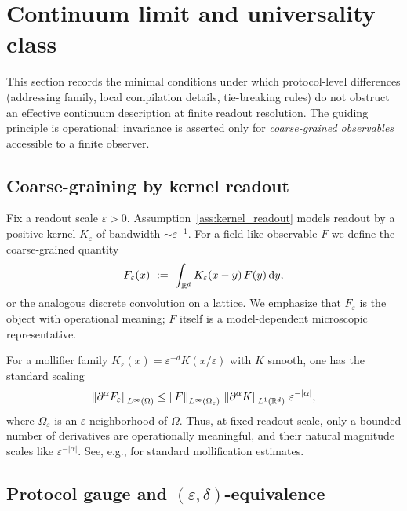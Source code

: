 \section{Continuum limit and universality class}
\label{sec:continuum_universality}

This section records the minimal conditions under which protocol-level differences (addressing family, local compilation details, tie-breaking rules) do not obstruct an effective continuum description at finite readout resolution.
The guiding principle is operational: invariance is asserted only for \emph{coarse-grained observables} accessible to a finite observer.

\subsection{Coarse-graining by kernel readout}
\label{subsec:kernel_coarse_grain}

Fix a readout scale $\varepsilon>0$.
Assumption~\ref{ass:kernel_readout} models readout by a positive kernel $K_\varepsilon$ of bandwidth $\sim \varepsilon^{-1}$.
For a field-like observable $F$ we define the coarse-grained quantity
\begin{equation}
  F_\varepsilon(x)\ :=\ \int_{\mathbb{R}^d} K_\varepsilon(x-y)\,F(y)\,\mathrm{d} y,
\end{equation}
or the analogous discrete convolution on a lattice.
We emphasize that $F_\varepsilon$ is the object with operational meaning; $F$ itself is a model-dependent microscopic representative.

\begin{remark}
\label{rem:mollifier_derivative_scaling}
For a mollifier family $K_\varepsilon(x)=\varepsilon^{-d}K(x/\varepsilon)$ with $K$ smooth, one has the standard scaling
\begin{equation}
  \left\lVert \partial^\alpha F_\varepsilon\right\rVert_{L^\infty(\Omega)}
  \le \left\lVert F\right\rVert_{L^\infty(\Omega_\varepsilon)}\,\left\lVert \partial^\alpha K\right\rVert_{L^1(\mathbb{R}^d)}\,\varepsilon^{-|\alpha|},
\end{equation}
where $\Omega_\varepsilon$ is an $\varepsilon$-neighborhood of $\Omega$.
Thus, at fixed readout scale, only a bounded number of derivatives are operationally meaningful, and their natural magnitude scales like $\varepsilon^{-|\alpha|}$.
See, e.g., \cite{Evans2010} for standard mollification estimates.
\end{remark}

\subsection{Protocol gauge and \texorpdfstring{$(\varepsilon,\delta)$}{(epsilon,delta)}-equivalence}
\label{subsec:eps_delta_equiv}

